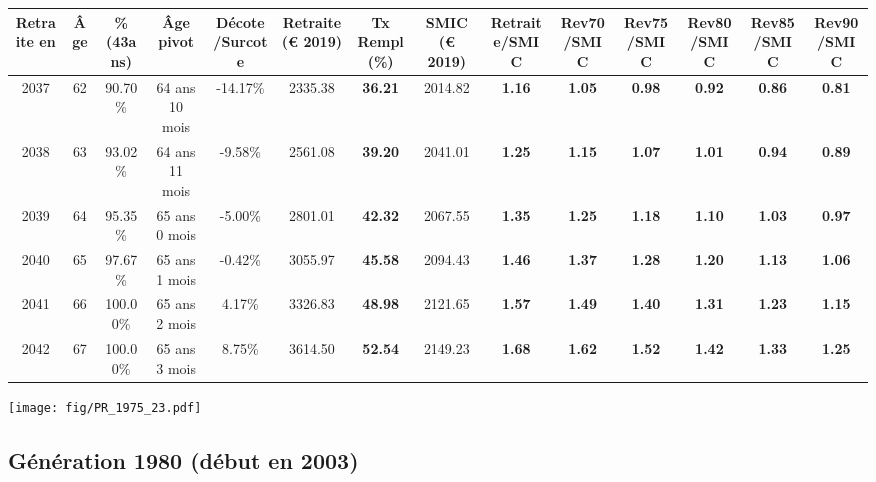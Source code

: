 \begin{adjustbox}{max width=\textwidth} 
\begin{tabular}[htb]{|c|c||c|c|c||c|c||c||c|c|c|c|c|c|} 
\hline 
 Retraite en &  Âge &  \%(43ans) &  Âge pivot &  Décote/Surcote &  Retraite (\euro{} 2019) &  Tx Rempl(\%) &  SMIC (\euro{} 2019) &  Retraite/SMIC &  Rev70/SMIC &  Rev75/SMIC &  Rev80/SMIC &  Rev85/SMIC &  Rev90/SMIC \\ 
\hline \hline 
 2037 &  62 &  90.70\% &  64 ans 10 mois &  -14.17\% &  2335.38 &  {\bf 36.21} &  2014.82 &  {\bf 1.16} &  {\bf 1.05} &  {\bf {\color{red} 0.98}} &  {\bf {\color{red} 0.92}} &  {\bf {\color{red} 0.86}} &  {\bf {\color{red} 0.81}} \\ 
\hline 
 2038 &  63 &  93.02\% &  64 ans 11 mois &  -9.58\% &  2561.08 &  {\bf 39.20} &  2041.01 &  {\bf 1.25} &  {\bf 1.15} &  {\bf 1.07} &  {\bf 1.01} &  {\bf {\color{red} 0.94}} &  {\bf {\color{red} 0.89}} \\ 
\hline 
 2039 &  64 &  95.35\% &  65 ans 0 mois &  -5.00\% &  2801.01 &  {\bf 42.32} &  2067.55 &  {\bf 1.35} &  {\bf 1.25} &  {\bf 1.18} &  {\bf 1.10} &  {\bf 1.03} &  {\bf {\color{red} 0.97}} \\ 
\hline 
 2040 &  65 &  97.67\% &  65 ans 1 mois &  -0.42\% &  3055.97 &  {\bf 45.58} &  2094.43 &  {\bf 1.46} &  {\bf 1.37} &  {\bf 1.28} &  {\bf 1.20} &  {\bf 1.13} &  {\bf 1.06} \\ 
\hline 
 2041 &  66 &  100.00\% &  65 ans 2 mois &  4.17\% &  3326.83 &  {\bf 48.98} &  2121.65 &  {\bf 1.57} &  {\bf 1.49} &  {\bf 1.40} &  {\bf 1.31} &  {\bf 1.23} &  {\bf 1.15} \\ 
\hline 
 2042 &  67 &  100.00\% &  65 ans 3 mois &  8.75\% &  3614.50 &  {\bf 52.54} &  2149.23 &  {\bf 1.68} &  {\bf 1.62} &  {\bf 1.52} &  {\bf 1.42} &  {\bf 1.33} &  {\bf 1.25} \\ 
\hline 
\hline 
\end{tabular} 
\end{adjustbox} 
 
 \vspace{0.1cm} 

 \begin{center}\texttt{[image: fig/PR\_1975\_23.pdf]}\end{center} \label{fig/PR_1975_23.pdf} 

\newpage 
 
\subsection{Génération 1980 (début en 2003)} 

